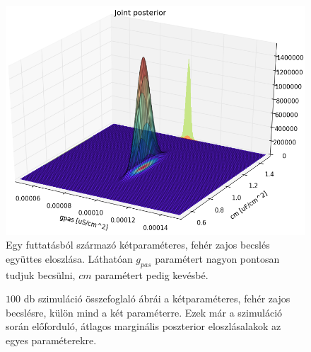 \begin{figure}[h!]
	\centering
	\includegraphics[width=0.8\linewidth]{fig/wn2/JointP_cm_gpas(1).png}
	\caption[Egykompartmentumos modell fehér zaj együttes poszterior eloszlása]{Egy futtatásból származó kétparaméteres, fehér zajos becslés együttes eloszlása. Láthatóan $g_{pas}$ paramétert nagyon pontosan tudjuk becsülni, $cm$ paramétert pedig kevésbé.}
	\label{fig:wn2_joint}
\end{figure}


\begin{figure}[h!]
	\centering
	\caption[Egy kompartmentum két paraméter, fehér zaj eredmény]{$100$ db szimuláció összefoglaló ábrái a kétparaméteres, fehér zajos becslésre, külön mind a két paraméterre. Ezek már a szimuláció során előforduló, átlagos marginális poszterior eloszlásalakok az egyes paraméterekre.}
	\label{fig:wn2}
\end{figure}


